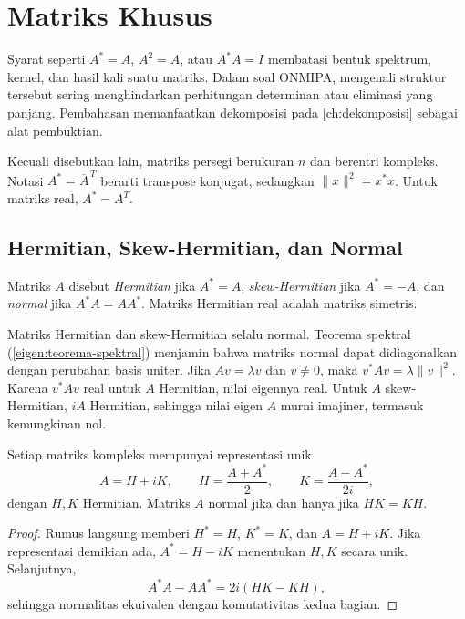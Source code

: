 \chapter{Matriks Khusus}
\label{ch:matriks-khusus}

Syarat seperti $A^*=A$, $A^2=A$, atau $A^*A=I$ membatasi bentuk
spektrum, kernel, dan hasil kali suatu matriks. Dalam soal ONMIPA,
mengenali struktur tersebut sering menghindarkan perhitungan
determinan atau eliminasi yang panjang.
Pembahasan memanfaatkan dekomposisi pada
\autoref{ch:dekomposisi} sebagai alat pembuktian.

Kecuali disebutkan lain, matriks persegi berukuran $n$ dan berentri
kompleks. Notasi $A^*=\overline A^{\,T}$ berarti transpose konjugat,
sedangkan $\|x\|^2=x^*x$. Untuk matriks real, $A^*=A^T$.

\section{Hermitian, Skew-Hermitian, dan Normal}
\label{khusus:hermitian}

\begin{definisi}
    Matriks $A$ disebut \emph{Hermitian} jika $A^*=A$,
    \emph{skew-Hermitian} jika $A^*=-A$, dan \emph{normal} jika
    $A^*A=AA^*$. Matriks Hermitian real adalah matriks simetris.
\end{definisi}

Matriks Hermitian dan skew-Hermitian selalu normal.
Teorema spektral (\autoref{eigen:teorema-spektral}) menjamin bahwa
matriks normal dapat didiagonalkan dengan perubahan basis uniter.
Jika $Av=\lambda v$ dan $v\ne0$, maka
$v^*Av=\lambda\|v\|^2$. Karena $v^*Av$ real untuk $A$ Hermitian,
nilai eigennya real. Untuk $A$ skew-Hermitian, $iA$ Hermitian,
sehingga nilai eigen $A$ murni imajiner, termasuk kemungkinan nol.

\begin{prop}
    \label{khusus:bagian-hermitian}
    Setiap matriks kompleks mempunyai representasi unik
    \[
        A=H+iK,\qquad H=\frac{A+A^*}{2},\qquad
        K=\frac{A-A^*}{2i},
    \]
    dengan $H,K$ Hermitian. Matriks $A$ normal jika dan hanya jika
    $HK=KH$.
\end{prop}
\begin{proof}
    Rumus langsung memberi $H^*=H$, $K^*=K$, dan $A=H+iK$.
    Jika representasi demikian ada, $A^*=H-iK$ menentukan $H,K$
    secara unik. Selanjutnya,
    \[
        A^*A-AA^*=2i(HK-KH),
    \]
    sehingga normalitas ekuivalen dengan komutativitas kedua bagian.
\end{proof}

